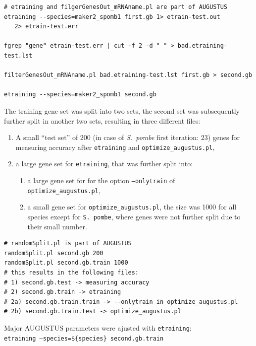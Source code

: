 \documentclass[a4paper,10pt]{report}
\begin{document}
\begin{verbatim}
# etraining and filgerGenesOut_mRNAname.pl are part of AUGUSTUS
etraining --species=maker2_spomb1 first.gb 1> etrain-test.out 
   2> etrain-test.err
   
fgrep "gene" etrain-test.err | cut -f 2 -d " " > bad.etraining-test.lst

filterGenesOut_mRNAname.pl bad.etraining-test.lst first.gb > second.gb

etraining --species=maker2_spomb1 second.gb
\end{verbatim}

\noindent The training gene set was split into two sets, the second set was subsequently further split in another two sets, resulting in three different files:

\begin{enumerate}
 \item A small ``test set'' of 200 (in case of \textit{S.~pombe} first iteration: 23) genes for measuring accuracy after \texttt{etraining} and \texttt{optimize\_augustus.pl}, 
 \item a large gene set for \texttt{etraining}, that was further split into:
 \begin{enumerate}
 \item a large gene set for for the option \texttt{--onlytrain} of \\\texttt{optimize\_augustus.pl},
 \item a small gene set for \texttt{optimize\_augustus.pl}, the size was 1000 for all species except for \texttt{S.~pombe}, where genes were not further split due to their small number.
 \end{enumerate}
\end{enumerate}

\begin{verbatim}
# randomSplit.pl is part of AUGUSTUS
randomSplit.pl second.gb 200
randomSplit.pl second.gb.train 1000
# this results in the following files:
# 1) second.gb.test -> measuring accuracy
# 2) second.gb.train -> etraining
# 2a) second.gb.train.train -> --onlytrain in optimize_augustus.pl
# 2b) second.gb.train.test -> optimize_augustus.pl
\end{verbatim}

\noindent Major AUGUSTUS parameters were ajusted with \texttt{etraining}:\\

\noindent \texttt{etraining --species=\$\{species\} second.gb.train}\\
\end{document}
